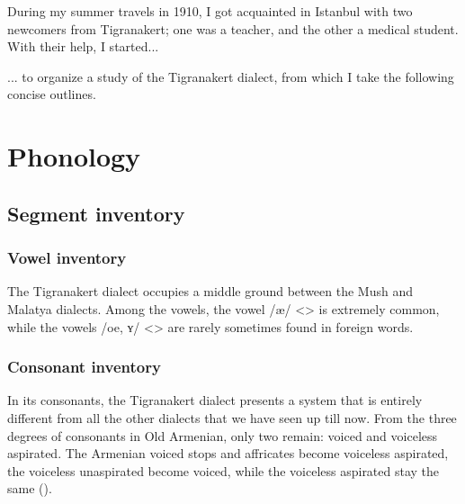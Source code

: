 During my summer travels in 1910, I got acquainted in Istanbul with two newcomers from Tigranakert; one was a teacher, and the other a medical student. With their help, I started... 

\begin{adjarianpage}\label{page:160}\end{adjarianpage}%

... to organize a study of the Tigranakert dialect, from which I take the following concise outlines. 


\section{Phonology}

\subsection{Segment inventory}

\subsubsection{Vowel inventory}

The Tigranakert dialect occupies a middle ground between the Mush and Malatya dialects. Among the vowels, the vowel /æ/ <> is extremely common, while the vowels /oe, ʏ/ <> are rarely sometimes found in foreign words. 

\subsubsection{Consonant inventory}

In its consonants, the Tigranakert dialect presents a system that is entirely different from all the other dialects that we have seen up till now. From the three degrees of consonants in Old Armenian, only two remain: voiced and voiceless aspirated. The Armenian voiced stops and affricates become voiceless aspirated, the voiceless unaspirated become voiced, while the voiceless aspirated stay the same (). 



